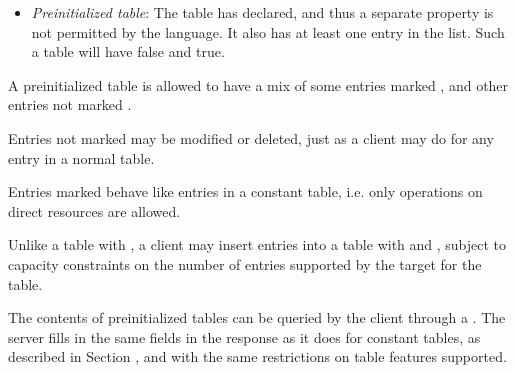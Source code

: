 \documentclass[11pt]{article}
\begin{document}
{\begin{itemize}[noitemsep,topsep=\mdcompacttopsep]
\item{}\emph{Preinitialized table}: The table has  declared, and thus a
separate  property is not permitted by the language.
It also has at least one entry in the list.  Such a table will have
 false and  true.%
\end{itemize}%

\noindent{}A preinitialized table is allowed to have a mix of some entries marked
, and other entries not marked .%

Entries not marked  may be modified or deleted, just as a
client may do for any entry in a normal table.%

Entries marked  behave like entries in a constant table,
i.e. only  operations on direct resources are allowed.%

Unlike a table with , a client may insert
entries into a table with  and
, subject to capacity constraints on the
number of entries supported by the target for the table.%

The contents of preinitialized tables can be queried by the client
through a .  The server fills in the same fields in the
response as it does for constant tables, as described in Section
, and with the same restrictions on table
features supported.%

}
\end{document}
